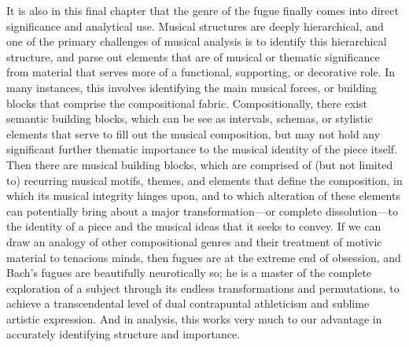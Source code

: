 It is also in this final chapter that the genre of the fugue finally
comes into direct significance and analytical use. Musical structures
are deeply hierarchical, and one of the primary challenges of musical
analysis is to identify this hierarchical structure, and parse out
elements that are of musical or thematic significance from material that
serves more of a functional, supporting, or decorative role. In many
instances, this involves identifying the main musical forces, or
building blocks that comprise the compositional fabric. Compositionally,
there exist semantic building blocks, which can be see as intervals,
schemas, or stylistic elements that serve to fill out the musical
composition, but may not hold any significant further thematic
importance to the musical identity of the piece itself. Then there are
musical building blocks, which are comprised of (but not limited to)
recurring musical motifs, themes, and elements that define the
composition, in which its musical integrity hinges upon, and to which
alteration of these elements can potentially bring about a major
transformation---or complete dissolution---to the identity of a
piece and the musical ideas that it seeks to convey. If we can draw an
analogy of other compositional genres and their treatment of motivic
material to tenacious minds, then fugues are at the extreme end of
obsession, and Bach's fugues are beautifully neurotically so; he is a
master of the complete exploration of a subject through its endless
transformations and permutations, to achieve a transcendental level of
dual contrapuntal athleticism and sublime artistic expression. And in
analysis, this works very much to our advantage in accurately
identifying structure and importance.

